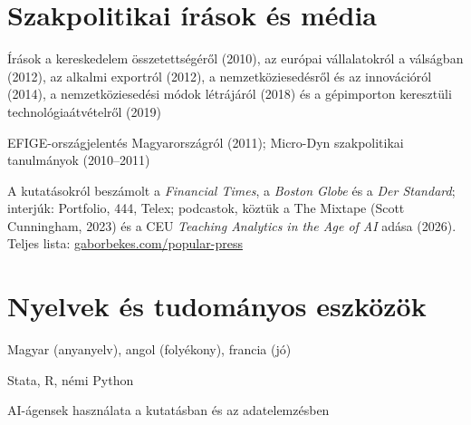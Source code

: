\documentclass[10pt,a4paper]{article}
\begin{document}
\section{Szakpolitikai írások és média}
\begin{cvlist}
  \item[VoxEU] Írások a kereskedelem összetettségéről (2010), az európai vállalatokról a válságban (2012), az alkalmi exportról (2012), a nemzetköziesedésről és az innovációról (2014), a nemzetköziesedési módok létrájáról (2018) és a gépimporton keresztüli technológiaátvételről (2019)
  \item[Jelentések] EFIGE-országjelentés Magyarországról (2011); Micro-Dyn szakpolitikai tanulmányok (2010--2011)
  \item[Média] A kutatásokról beszámolt a \textit{Financial Times}, a \textit{Boston Globe} és a \textit{Der Standard}; interjúk: Portfolio, 444, Telex; podcastok, köztük a The Mixtape (Scott Cunningham, 2023) és a CEU \textit{Teaching Analytics in the Age of AI} adása (2026). Teljes lista: \href{https://gaborbekes.com/popular-press/}{gaborbekes.com/popular-press}
\end{cvlist}

\section{Nyelvek és tudományos eszközök}
\begin{cvlist}
  \item[Nyelvek] Magyar (anyanyelv), angol (folyékony), francia (jó)
  \item[Kódolás] Stata, R, némi Python
  \item[AI] AI-ágensek használata a kutatásban és az adatelemzésben
\end{cvlist}
\end{document}
